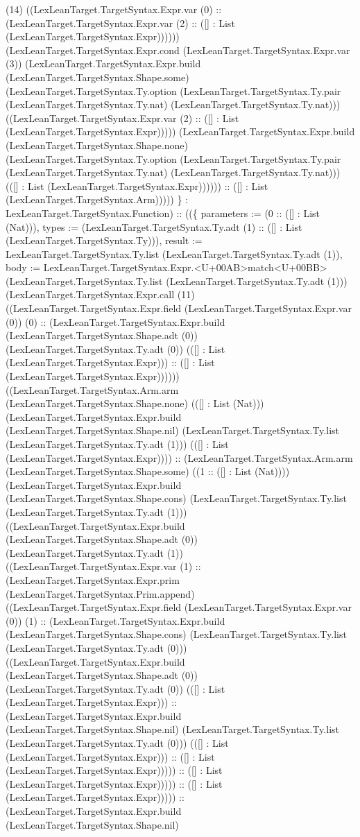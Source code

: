 \documentclass[11pt]{article}
\begin{document}
(14) ((LexLeanTarget.TargetSyntax.Expr.var (0) :: (LexLeanTarget.TargetSyntax.Expr.var (2) :: ([] : List (LexLeanTarget.TargetSyntax.Expr)))))) (LexLeanTarget.TargetSyntax.Expr.cond (LexLeanTarget.TargetSyntax.Expr.var (3)) (LexLeanTarget.TargetSyntax.Expr.build (LexLeanTarget.TargetSyntax.Shape.some) (LexLeanTarget.TargetSyntax.Ty.option (LexLeanTarget.TargetSyntax.Ty.pair (LexLeanTarget.TargetSyntax.Ty.nat) (LexLeanTarget.TargetSyntax.Ty.nat))) ((LexLeanTarget.TargetSyntax.Expr.var (2) :: ([] : List (LexLeanTarget.TargetSyntax.Expr))))) (LexLeanTarget.TargetSyntax.Expr.build (LexLeanTarget.TargetSyntax.Shape.none) (LexLeanTarget.TargetSyntax.Ty.option (LexLeanTarget.TargetSyntax.Ty.pair (LexLeanTarget.TargetSyntax.Ty.nat) (LexLeanTarget.TargetSyntax.Ty.nat))) (([] : List (LexLeanTarget.TargetSyntax.Expr)))))) :: ([] : List (LexLeanTarget.TargetSyntax.Arm))))) \} : LexLeanTarget.TargetSyntax.Function) :: ((\{ parameters := (0 :: ([] : List (Nat))), types := (LexLeanTarget.TargetSyntax.Ty.adt (1) :: ([] : List (LexLeanTarget.TargetSyntax.Ty))), result := LexLeanTarget.TargetSyntax.Ty.list (LexLeanTarget.TargetSyntax.Ty.adt (1)), body := LexLeanTarget.TargetSyntax.Expr.<U+00AB>match<U+00BB> (LexLeanTarget.TargetSyntax.Ty.list (LexLeanTarget.TargetSyntax.Ty.adt (1))) (LexLeanTarget.TargetSyntax.Expr.call (11) ((LexLeanTarget.TargetSyntax.Expr.field (LexLeanTarget.TargetSyntax.Expr.var (0)) (0) :: (LexLeanTarget.TargetSyntax.Expr.build (LexLeanTarget.TargetSyntax.Shape.adt (0)) (LexLeanTarget.TargetSyntax.Ty.adt (0)) (([] : List (LexLeanTarget.TargetSyntax.Expr))) :: ([] : List (LexLeanTarget.TargetSyntax.Expr)))))) ((LexLeanTarget.TargetSyntax.Arm.arm (LexLeanTarget.TargetSyntax.Shape.none) (([] : List (Nat))) (LexLeanTarget.TargetSyntax.Expr.build (LexLeanTarget.TargetSyntax.Shape.nil) (LexLeanTarget.TargetSyntax.Ty.list (LexLeanTarget.TargetSyntax.Ty.adt (1))) (([] : List (LexLeanTarget.TargetSyntax.Expr)))) :: (LexLeanTarget.TargetSyntax.Arm.arm (LexLeanTarget.TargetSyntax.Shape.some) ((1 :: ([] : List (Nat)))) (LexLeanTarget.TargetSyntax.Expr.build (LexLeanTarget.TargetSyntax.Shape.cons) (LexLeanTarget.TargetSyntax.Ty.list (LexLeanTarget.TargetSyntax.Ty.adt (1))) ((LexLeanTarget.TargetSyntax.Expr.build (LexLeanTarget.TargetSyntax.Shape.adt (0)) (LexLeanTarget.TargetSyntax.Ty.adt (1)) ((LexLeanTarget.TargetSyntax.Expr.var (1) :: (LexLeanTarget.TargetSyntax.Expr.prim (LexLeanTarget.TargetSyntax.Prim.append) ((LexLeanTarget.TargetSyntax.Expr.field (LexLeanTarget.TargetSyntax.Expr.var (0)) (1) :: (LexLeanTarget.TargetSyntax.Expr.build (LexLeanTarget.TargetSyntax.Shape.cons) (LexLeanTarget.TargetSyntax.Ty.list (LexLeanTarget.TargetSyntax.Ty.adt (0))) ((LexLeanTarget.TargetSyntax.Expr.build (LexLeanTarget.TargetSyntax.Shape.adt (0)) (LexLeanTarget.TargetSyntax.Ty.adt (0)) (([] : List (LexLeanTarget.TargetSyntax.Expr))) :: (LexLeanTarget.TargetSyntax.Expr.build (LexLeanTarget.TargetSyntax.Shape.nil) (LexLeanTarget.TargetSyntax.Ty.list (LexLeanTarget.TargetSyntax.Ty.adt (0))) (([] : List (LexLeanTarget.TargetSyntax.Expr))) :: ([] : List (LexLeanTarget.TargetSyntax.Expr))))) :: ([] : List (LexLeanTarget.TargetSyntax.Expr))))) :: ([] : List (LexLeanTarget.TargetSyntax.Expr))))) :: (LexLeanTarget.TargetSyntax.Expr.build (LexLeanTarget.TargetSyntax.Shape.nil) 
\end{document}
